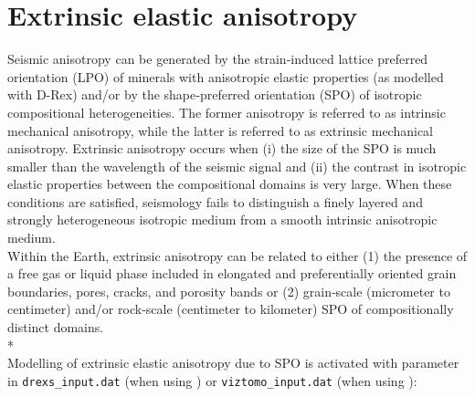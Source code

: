\section{Extrinsic elastic anisotropy}
\label{section:elasticSPO}
Seismic anisotropy can be generated by the strain‐induced lattice preferred orientation (LPO) of minerals with anisotropic elastic properties (as modelled with D-Rex) and/or by the shape‐preferred orientation (SPO) of isotropic compositional heterogeneities. The former anisotropy is referred to as intrinsic mechanical anisotropy, while the latter is referred to as extrinsic mechanical anisotropy. Extrinsic anisotropy occurs when (i) the size of the SPO is much smaller than the wavelength of the seismic signal and (ii) the contrast in isotropic elastic properties between the compositional domains is very large. When these conditions are satisfied, seismology fails to distinguish a finely layered and strongly heterogeneous isotropic medium from a smooth intrinsic anisotropic medium.\\
Within the Earth, extrinsic anisotropy can be related to either (1) the presence of a free gas or liquid phase included in elongated and preferentially oriented grain boundaries, pores, cracks, and porosity bands or (2) grain‐scale (micrometer to centimeter) and/or rock‐scale (centimeter to kilometer) SPO of compositionally distinct domains.\\*
\\
Modelling of extrinsic elastic anisotropy due to SPO is activated with parameter  in \texttt{drexs\_input.dat} (when using \drexstitle{})  or \texttt{viztomo\_input.dat} (when using \viztomotitle{}):
